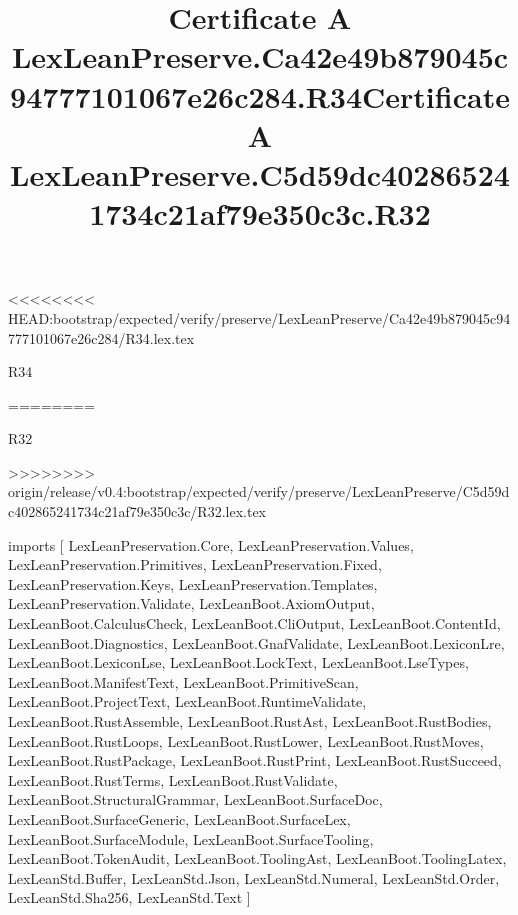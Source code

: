 <<<<<<<< HEAD:bootstrap/expected/verify/preserve/LexLeanPreserve/Ca42e49b879045c94777101067e26c284/R34.lex.tex
\begin{lexlean}{R34}
\title{Certificate A LexLeanPreserve.Ca42e49b879045c94777101067e26c284.R34}
========
\begin{lexlean}{R32}
\title{Certificate A LexLeanPreserve.C5d59dc402865241734c21af79e350c3c.R32}
>>>>>>>> origin/release/v0.4:bootstrap/expected/verify/preserve/LexLeanPreserve/C5d59dc402865241734c21af79e350c3c/R32.lex.tex
\begin{coremodule}
imports [
  LexLeanPreservation.Core,
  LexLeanPreservation.Values,
  LexLeanPreservation.Primitives,
  LexLeanPreservation.Fixed,
  LexLeanPreservation.Keys,
  LexLeanPreservation.Templates,
  LexLeanPreservation.Validate,
  LexLeanBoot.AxiomOutput,
  LexLeanBoot.CalculusCheck,
  LexLeanBoot.CliOutput,
  LexLeanBoot.ContentId,
  LexLeanBoot.Diagnostics,
  LexLeanBoot.GnafValidate,
  LexLeanBoot.LexiconLre,
  LexLeanBoot.LexiconLse,
  LexLeanBoot.LockText,
  LexLeanBoot.LseTypes,
  LexLeanBoot.ManifestText,
  LexLeanBoot.PrimitiveScan,
  LexLeanBoot.ProjectText,
  LexLeanBoot.RuntimeValidate,
  LexLeanBoot.RustAssemble,
  LexLeanBoot.RustAst,
  LexLeanBoot.RustBodies,
  LexLeanBoot.RustLoops,
  LexLeanBoot.RustLower,
  LexLeanBoot.RustMoves,
  LexLeanBoot.RustPackage,
  LexLeanBoot.RustPrint,
  LexLeanBoot.RustSucceed,
  LexLeanBoot.RustTerms,
  LexLeanBoot.RustValidate,
  LexLeanBoot.StructuralGrammar,
  LexLeanBoot.SurfaceDoc,
  LexLeanBoot.SurfaceGeneric,
  LexLeanBoot.SurfaceLex,
  LexLeanBoot.SurfaceModule,
  LexLeanBoot.SurfaceTooling,
  LexLeanBoot.TokenAudit,
  LexLeanBoot.ToolingAst,
  LexLeanBoot.ToolingLatex,
  LexLeanStd.Buffer,
  LexLeanStd.Json,
  LexLeanStd.Numeral,
  LexLeanStd.Order,
  LexLeanStd.Sha256,
  LexLeanStd.Text
]


\end{coremodule}
\end{lexlean}
\end{lexlean}
